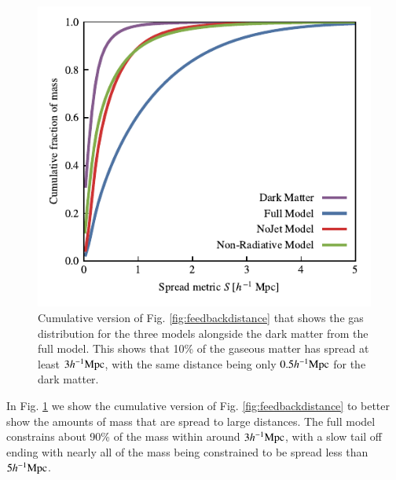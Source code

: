 \begin{figure}
    \centering
    \includegraphics{figures/cumulative_histogram_comparison.pdf}
    \vspace{-0.7cm}
    \caption{Cumulative version of Fig. \ref{fig:feedbackdistance} that
    shows the gas distribution for the three models alongside the dark
    matter from the full model. This shows that 10\% of the
    gaseous matter has spread at least $3h^{-1}{\rm Mpc}{}$, with the same
    distance being only $0.5 h^{-1}{\rm Mpc}{}$ for the dark matter.}
    \label{fig:cumulativehistogram}
\end{figure}

In Fig. \ref{fig:cumulativehistogram} we show the cumulative version of Fig.
\ref{fig:feedbackdistance} to better show the amounts of mass that are spread
to large distances. The full model constrains about 90\% of the mass within
around $3h^{-1}{\rm Mpc}{}$, with a slow tail off ending with nearly all of the mass
being constrained to be spread less than $5h^{-1}{\rm Mpc}{}$.
